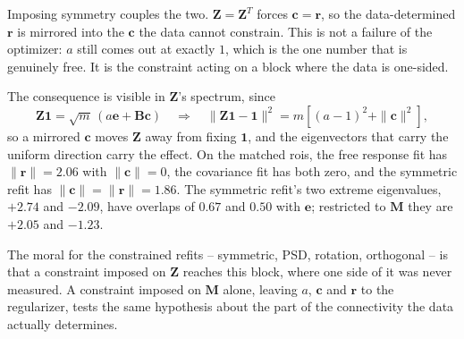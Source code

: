 \documentclass[10pt]{article}
\newcommand{\ZZ}{\mathbf{Z}}
\newcommand{\bone}{\mathbf{1}}
\newcommand{\cc}{\mathbf{c}}
\newcommand{\ee}{\mathbf{e}}
\newcommand{\rr}{\mathbf{r}}
\newcommand{\BB}{\mathbf{B}}
\newcommand{\MM}{\mathbf{M}}
\begin{document}
Imposing symmetry couples the two. $\ZZ = \ZZ^T$ forces $\cc = \rr$, so the
data-determined $\rr$ is mirrored into the $\cc$ the data cannot constrain.
This is not a failure of the optimizer: $a$ still comes out at exactly $1$,
which is the one number that is genuinely free. It is the constraint acting on
a block where the data is one-sided.

The consequence is visible in $\ZZ$'s spectrum, since
$$ \ZZ \bone = \sqrt{m}\,(a \ee + \BB \cc) \quad\Longrightarrow\quad
\|\ZZ \bone - \bone\|^2 = m\left[(a-1)^2 + \|\cc\|^2\right], $$
so a mirrored $\cc$ moves $\ZZ$ away from fixing $\bone$, and the eigenvectors
that carry the uniform direction carry the effect. On the matched rois, the free
response fit has $\|\rr\| = 2.06$ with $\|\cc\| = 0$, the covariance fit has both
zero, and the symmetric refit has $\|\cc\| = \|\rr\| = 1.86$. The symmetric
refit's two extreme eigenvalues, $+2.74$ and $-2.09$, have overlaps of $0.67$ and
$0.50$ with $\ee$; restricted to $\MM$ they are $+2.05$ and $-1.23$.

The moral for the constrained refits -- symmetric, PSD, rotation, orthogonal --
is that a constraint imposed on $\ZZ$ reaches this block, where one side of it
was never measured. A constraint imposed on $\MM$ alone, leaving $a$, $\cc$ and
$\rr$ to the regularizer, tests the same hypothesis about the part of the
connectivity the data actually determines.
\end{document}

